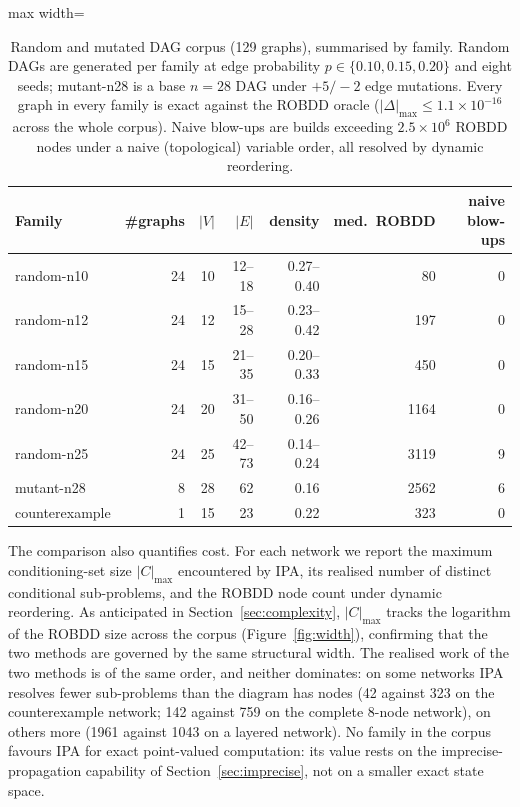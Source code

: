 \documentclass[preprint,12pt]{elsarticle}
\begin{document}
\begin{table}[ht]
\centering\small
\caption{Random and mutated DAG corpus (129 graphs), summarised by family. Random DAGs are generated per family at edge probability $p\in\{0.10,0.15,0.20\}$ and eight seeds; mutant-n28 is a base $n=28$ DAG under $+5/-2$ edge mutations. Every graph in every family is exact against the ROBDD oracle ($|\Delta|_{\max}\le1.1\times10^{-16}$ across the whole corpus). Naive blow-ups are builds exceeding $2.5\times10^{6}$ ROBDD nodes under a naive (topological) variable order, all resolved by dynamic reordering.}
\label{tab:corpus}
\begin{adjustbox}{max width=\linewidth}
\begin{tabular}{lrrrrrr}
\toprule
Family & \#graphs & $|V|$ & $|E|$ & density & med.\ ROBDD & naive blow-ups \\
\midrule
random-n10  & 24 & 10 & 12--18 & 0.27--0.40 &   80 & 0 \\
random-n12  & 24 & 12 & 15--28 & 0.23--0.42 &  197 & 0 \\
random-n15  & 24 & 15 & 21--35 & 0.20--0.33 &  450 & 0 \\
random-n20  & 24 & 20 & 31--50 & 0.16--0.26 & 1164 & 0 \\
random-n25  & 24 & 25 & 42--73 & 0.14--0.24 & 3119 & 9 \\
mutant-n28  &  8 & 28 & 62     & 0.16       & 2562 & 6 \\
counterexample &  1 & 15 & 23  & 0.22       &  323 & 0 \\
\bottomrule
\end{tabular}
\end{adjustbox}
\end{table}

The comparison also quantifies cost. For each network we report the maximum conditioning-set size $|C|_{\max}$ encountered by IPA, its realised number of distinct conditional sub-problems, and the ROBDD node count under dynamic reordering. As anticipated in Section~\ref{sec:complexity}, $|C|_{\max}$ tracks the logarithm of the ROBDD size across the corpus (Figure~\ref{fig:width}), confirming that the two methods are governed by the same structural width. The realised work of the two methods is of the same order, and neither dominates: on some networks IPA resolves fewer sub-problems than the diagram has nodes (42 against 323 on the counterexample network; 142 against 759 on the complete 8-node network), on others more (1961 against 1043 on a layered network). No family in the corpus favours IPA for exact point-valued computation: its value rests on the imprecise-propagation capability of Section~\ref{sec:imprecise}, not on a smaller exact state space.
\end{document}
